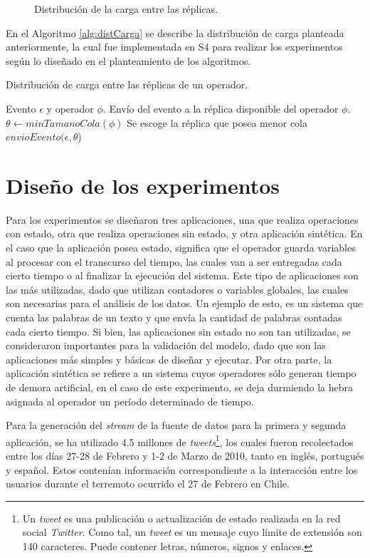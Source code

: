 \begin{figure}[!ht]
	\caption{Distribución de la carga entre las réplicas.}
	\label{fig:distCarga}
\end{figure}

En el Algoritmo \ref{alg:distCarga} se describe la distribución de carga planteada anteriormente, la cual fue implementada en S4 para realizar los experimentos según lo diseñado en el planteamiento de los algoritmos.

\begin{algorithm}[!ht]
	\caption{Distribución de carga entre las réplicas de un operador.}
	\label{alg:distCarga}
	\begin{algorithmic}[1]
	\REQUIRE Evento $\epsilon$ y operador $\phi$.
	\ENSURE Envío del evento a la réplica disponible del operador $\phi$.
	\STATE $\theta \leftarrow minTamanoCola(\phi)$ \COMMENT Se escoge la réplica que posea menor cola
	\STATE $envioEvento(\epsilon,\theta$)
	\end{algorithmic}
\end{algorithm}

\section{Diseño de los experimentos}
Para los experimentos se diseñaron tres aplicaciones, una que realiza operaciones con estado, otra que realiza operaciones sin estado, y otra aplicación sintética. En el caso que la aplicación posea estado, significa que el operador guarda variables al procesar con el transcurso del tiempo, las cuales van a ser entregadas cada cierto tiempo o al finalizar la ejecución del sistema. Este tipo de aplicaciones son las más utilizadas, dado que utilizan contadores o variables globales, las cuales son necesarias para el análisis de los datos. Un ejemplo de esto, es un sistema que cuenta las palabras de un texto y que envía la cantidad de palabras contadas cada cierto tiempo. Si bien, las aplicaciones sin estado no son tan utilizadas, se consideraron importantes para la validación del modelo, dado que son las aplicaciones más simples y básicas de diseñar y ejecutar. Por otra parte, la aplicación sintética se refiere a un sistema cuyos operadores sólo generan tiempo de demora artificial, en el caso de este experimento, se deja durmiendo la hebra asignada al operador un período determinado de tiempo.

Para la generación del \textit{stream} de la fuente de datos para la primera y segunda aplicación, se ha utilizado 4.5 millones de \textit{tweets}\footnote{Un \textit{tweet} es una publicación o actualización de estado realizada en la red social \textit{Twitter}. Como tal, un \textit{tweet} es un mensaje cuyo límite de extensión son 140 caracteres. Puede contener letras, números, signos y enlaces.}, los cuales fueron recolectados entre los días 27-28 de Febrero y 1-2 de Marzo de 2010, tanto en inglés, portugués y español. Estos contenían información correspondiente a la interacción entre los usuarios durante el terremoto ocurrido el 27 de Febrero en Chile.

